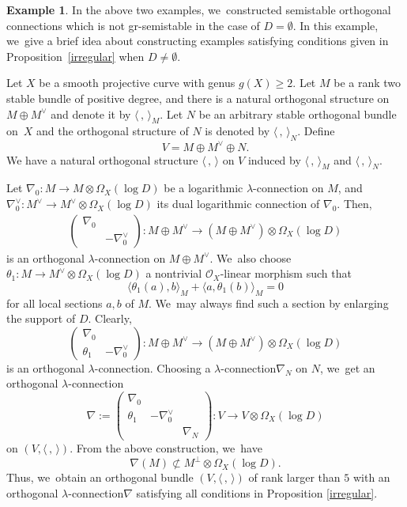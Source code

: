 \documentclass[JEP,XML,SOM,Unicode,published]{cedram}
\newcommand{\lconnection}{$\lambda$\nobreakdash-con\-nec\-tion\xspace}
\newcommand{\grsemistable}{gr\nobreakdash-semi\-stable\xspace}
\theoremstyle{plain}
\theoremstyle{definition}
\newtheorem{examp}[thm]{Example}
\begin{document}
\begin{examp}\label{exmp_idea}
In the above two examples, we~constructed semistable orthogonal connections which is not \grsemistable in the case of $D=\emptyset$. In this example, we~give a brief idea about constructing examples satisfying conditions given in Proposition~\ref{irregular} when $D\neq\emptyset$.

Let $X$ be a smooth projective curve with genus $g(X) \geq 2$. Let $M$ be a rank two stable bundle of positive degree, and there is a natural orthogonal structure on $M \oplus M^{\vee}$ and denote it by $\langle \,, \, \rangle_M$. Let $N$ be an arbitrary stable orthogonal bundle on~$X$ and the orthogonal structure of $N$ is denoted by $\langle \,, \, \rangle_N$. Define
\[
V=M\oplus M^\vee\oplus N.
\]
We have a natural orthogonal structure $\langle \,, \, \rangle$ on $V$ induced by $\langle \,, \, \rangle_M$ and $\langle \,, \, \rangle_N$.

Let $\nabla_0: M\to M\otimes\Omega_X(\log D)$ be a logarithmic \lconnection on $M$, and $\nabla_0^\vee: M^\vee \to M^\vee \otimes \Omega_X(\log D)$ its dual logarithmic connection of $\nabla_0$. Then,
\begin{align*}
\begin{pmatrix}
\nabla_0 & \\
& -\nabla^\vee_0
\end{pmatrix}: M \oplus M^\vee \to (M \oplus M^\vee) \otimes \Omega_X(\log D)
\end{align*}
is an orthogonal \lconnection on $M \oplus M^\vee$. We~also choose $\theta_1: M \to M^\vee \otimes \Omega_X(\log D)$ a nontrivial $\mathcal{O}_X$-linear morphism such that
\[
\langle \theta_1(a),b \rangle_M + \langle a,\theta_1(b) \rangle_M = 0
\]
for all local sections $a,b$ of $M$. We~may always find such a section by enlarging the support of $D$. Clearly,
\[
\begin{pmatrix}
\nabla_0 & \\
\theta_1 & -\nabla^\vee_0
\end{pmatrix}: M \oplus M^\vee \to (M \oplus M^\vee) \otimes \Omega_X(\log D)
\]
is an orthogonal \lconnection. Choosing a \lconnection $\nabla_N$ on $N$, we~get an orthogonal \lconnection
\[
\nabla:=
\begin{pmatrix}
\nabla_0 & & \\
\theta_1 & -\nabla^\vee_0 & \\
& & \nabla_N
\end{pmatrix}: V \to V \otimes \Omega_X(\log D)
\]
on $(V, \langle \,, \, \rangle)$. From the above construction, we~have
\[
\nabla(M)\not\subset M^\perp\otimes\Omega_X(\log D).
\]
Thus, we~obtain an orthogonal bundle $(V, \langle \,, \, \rangle)$ of rank larger than $5$ with an orthogonal \lconnection $\nabla$ satisfying all conditions in Proposition \ref{irregular}.
\end{examp}
\end{document}
